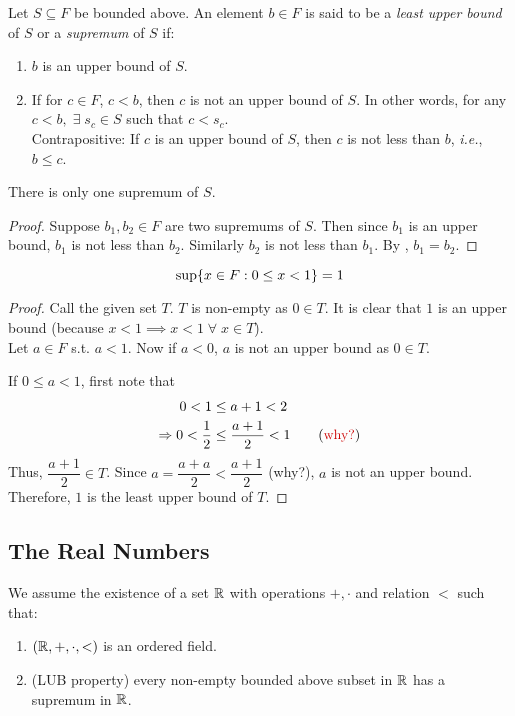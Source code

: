 \begin{defn} \label{defn:bounds:upper:supremum}
    Let $S \subseteq F$ be bounded above. An element $b \in F$ is said to be a \emph{least upper bound} of $S$ or a \emph{supremum} of $S$ if:
    \begin{enumerate}[label=(\alph*)]
        \item $b$ is an upper bound of $S$.
        \item If for $c \in F$, $c < b$, then $c$ is not an upper bound of $S$. In other words, for any $c < b, \;\exists\; s_{c} \in S$ such that $c < s_{c}$. \\
        Contrapositive: If $c$ is an upper bound of $S$, then $c$ is not less than $b$, \textit{i.e.}, $b \leq c$.
    \end{enumerate}
\end{defn}
\begin{rem}
    There is only one supremum of $S$.
\end{rem}
\begin{proof}
    Suppose $b_{1}, b_{2} \in F$ are two supremums of $S$. Then since $b_{1}$ is an upper bound, $b_{1}$ is not less than $b_{2}$. Similarly $b_{2}$ is not less than $b_{1}$. By , $b_{1} = b_{2}$.
\end{proof}

\begin{example}
    \[
        \sup \set{x \in F : 0 \leq x < 1} = 1
    \]
\end{example}
\begin{proof}
    Call the given set $T$. $T$ is non-empty as $0 \in T$. It is clear that $1$ is an upper bound (because $x < 1 \implies x < 1 \;\forall\; x \in T$). \\
    Let $a \in F$ s.t. $a < 1$. Now if $a < 0$, $a$ is not an upper bound as $0 \in T$.

    If $0 \leq a < 1$, first note that
    \begin{align*}
        0 < 1 &\leq a + 1 < 2 \\
        \implies 0 < \frac{1}{2} &\leq \frac{a+1}{2} < 1 \tag{\textcolor{exercise}{why?}}
    \end{align*}
    Thus, $\dfrac{a + 1}{2} \in T$.
    Since $a = \dfrac{a + a}{2} < \dfrac{a + 1}{2}$ (\textcolor{exercise}{why?}), $a$ is not an upper bound.
    Therefore, $1$ is the least upper bound of $T$.
\end{proof}

\subsection{The Real Numbers}
We assume the existence of a set $\mathbb{R}$ with operations $+, \cdot$ and relation $<$ such that:
\begin{enumerate}[label=(\alph*)]
    \item $(\mathbb{R}, +, \cdot, <)$ is an ordered field.
    \item (LUB property) every non-empty bounded above subset in $\mathbb{R}$ has a supremum in $\mathbb{R}$.
\end{enumerate}

